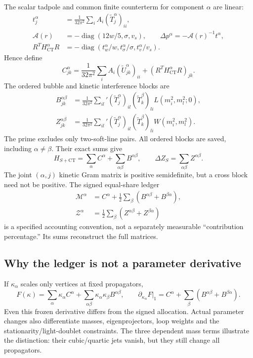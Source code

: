 \documentclass[11pt]{article}
\newcommand{\diag}{\operatorname{diag}}
\begin{document}
The scalar tadpole and common finite counterterm for component $\alpha$
are linear:
\begin{align}
 t^\alpha_j&=\frac{1}{32\pi^2}\sum_i A_i(\widetilde T^\alpha_j)_{ii},\\
 \mathcal A(r)&=-\diag(12w/5,\sigma,v_s),\qquad
 \Delta p^\alpha=-\mathcal A(r)^{-1}t^\alpha,\\
 R^TH_{\mathrm{CT}}^\alpha R
 &=-\diag(t^\alpha_w/w,t^\alpha_\sigma/\sigma,t^\alpha_v/v_s).
\end{align}
Hence define
\begin{equation}
 C^\alpha_{jk}=\frac{1}{32\pi^2}\sum_i A_i
 (\widetilde U^\alpha_{jk})_{ii}
 +(R^TH_{\mathrm{CT}}^\alpha R)_{jk}.
\end{equation}
The ordered bubble and kinetic interference blocks are
\begin{align}
 B^{\alpha\beta}_{jk}&=\frac{1}{32\pi^2}\sum_{il}'
 (\widetilde T^\alpha_j)_{il}(\widetilde T^\beta_k)_{li}
 L(m_i^2,m_l^2;0),\\
 Z^{\alpha\beta}_{jk}&=\frac{1}{32\pi^2}\sum_{il}'
 (\widetilde T^\alpha_j)_{il}(\widetilde T^\beta_k)_{li}
 W(m_i^2,m_l^2).
\end{align}
The prime excludes only two-soft-line pairs. All ordered blocks are
saved, including $\alpha\ne\beta$. Their exact sums give
\begin{equation}
 H_{S+\mathrm{CT}}=\sum_\alpha C^\alpha+\sum_{\alpha\beta}B^{\alpha\beta},
 \qquad \Delta Z_S=\sum_{\alpha\beta}Z^{\alpha\beta}.
\end{equation}
The joint $(\alpha,j)$ kinetic Gram matrix is positive semidefinite,
but a cross block need not be positive. The signed equal-share ledger
\begin{align}
 \mathscr M^\alpha&=C^\alpha+\tfrac12\sum_\beta
 (B^{\alpha\beta}+B^{\beta\alpha}),\\
 \mathscr Z^\alpha&=\tfrac12\sum_\beta
 (Z^{\alpha\beta}+Z^{\beta\alpha})
\end{align}
is a specified accounting convention, not a separately measurable
``contribution percentage.'' Its sums reconstruct the full matrices.

\subsection{Why the ledger is not a parameter derivative}
If $\kappa_\alpha$ scales only vertices at fixed propagators,
\begin{equation}
 F(\kappa)=\sum_\alpha\kappa_\alpha C^\alpha+
 \sum_{\alpha\beta}\kappa_\alpha\kappa_\beta B^{\alpha\beta},\qquad
 \partial_{\kappa_\alpha}F\big|_1
 =C^\alpha+\sum_\beta(B^{\alpha\beta}+B^{\beta\alpha}).
\end{equation}
Even this frozen derivative differs from the signed allocation. Actual
parameter changes also differentiate masses, eigenprojectors, loop
weights and the stationarity/light-doublet constraints. The three
dependent mass terms illustrate the distinction: their cubic/quartic
jets vanish, but they still change all propagators.
\end{document}
